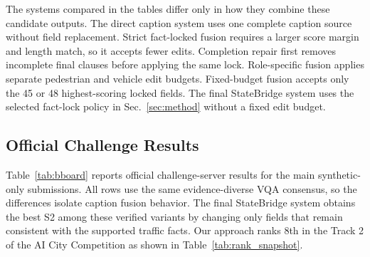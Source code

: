 \documentclass[runningheads]{llncs}
\begin{document}
The systems compared in the tables differ only in how they combine these candidate outputs. The direct caption system uses one complete caption source without field replacement. Strict fact-locked fusion requires a larger score margin and length match, so it accepts fewer edits. Completion repair first removes incomplete final clauses before applying the same lock. Role-specific fusion applies separate pedestrian and vehicle edit budgets. Fixed-budget fusion accepts only the 45 or 48 highest-scoring locked fields. The final StateBridge system uses the selected fact-lock policy in Sec.~\ref{sec:method} without a fixed edit budget.

\subsection{Official Challenge Results}

Table~\ref{tab:bboard} reports official challenge-server results for the main synthetic-only submissions. All rows use the same evidence-diverse VQA consensus, so the differences isolate caption fusion behavior. The final StateBridge system obtains the best S2 among these verified variants by changing only fields that remain consistent with the supported traffic facts. Our approach ranks 8th in the Track 2 of the AI City Competition as shown in Table~\ref{tab:rank_snapshot}.

\begin{table}[h!]
\centering
\caption{Official challenge-server results for synthetic-only submissions. Higher is better for all metrics.}
\label{tab:leaderboard}
\small
{}
\end{table}
\end{document}
